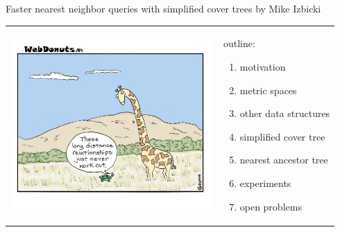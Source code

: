 \documentclass{beamer}
\author {Mike Izbicki}
\institute{UC Riverside}
\title[Simplified Cover Trees]{}
\theoremstyle{nameddefinition}
\newcommand\+{\op}
\begin{document}
 \beamertemplatenavigationsymbolsempty




\newcommand{\spacer}[1]{
    \begin{frame}
    \begin{center}
    \Huge\em{#1}
    \end{center}
    \end{frame}
}

\begin{frame}[fragile]{Faster nearest neighbor queries with simplified cover trees}
by Mike Izbicki

\vspace{1cm}
\begin{tabular}{p{7cm}p{4.5cm}}
\hspace{-0.5cm}
\includegraphics[height=6.5cm]{slides/distance.jpg}&
\vspace{-2.3in}
outline:
\begin{enumerate}
\item motivation
\item metric spaces
\item other data structures
\item simplified cover tree
\item nearest ancestor tree
\item experiments
\item open problems
\end{enumerate}
\end{tabular}
\end{frame}
\end{document}
